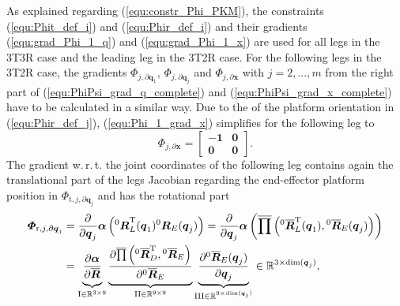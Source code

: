 \documentclass[robotics,article,submit,moreauthors,pdftex]{Definitions/mdpi}
\newcommand{\bm}[1]{\boldsymbol{#1}}
\newcommand{\rotmat}[2]{{{ }^{#1}\boldsymbol{R}}_{#2}}
\newcommand{\rotmato}[2]{{{ }^{#1}\boldsymbol{\overline{R}}}_{#2}}
\newcommand{\transp}[0]{{\mathrm{T}}}
\let\Phi\varPhi
\begin{document}
As explained regarding (\ref{equ:constr_Phi_PKM}), the constraints (\ref{equ:Phit_def_i}) and (\ref{equ:Phir_def_i}) and their gradients (\ref{equ:grad_Phi_1_q}) and (\ref{equ:grad_Phi_1_x}) are used for all legs in the 3T3R case and the leading leg in the 3T2R case.
For the following legs in the 3T2R case, the gradients $\bm{\Phi}_{j,\partial\bm{q}_1}$, $\bm{\Phi}_{j,\partial\bm{q}_j}$ and $\bm{\Phi}_{j,\partial\bm{x}}$ with $j=2,...,m$ from the right part of (\ref{equ:PhiPsi_grad_q_complete}) and (\ref{equ:PhiPsi_grad_x_complete}) have to be calculated in a similar way. 
Due to the  of the platform orientation in (\ref{equ:Phir_def_j}), (\ref{equ:Phi_1_grad_x}) simplifies for the following leg to 
%
\vspace{-0.1cm}
\begin{equation}
\bm{\Phi}_{j,\partial\bm{x}}
=
\begin{bmatrix}
-\bm{1} & \bm{0} \\
\bm{0} & \bm{0}
\end{bmatrix}.
\end{equation}
%
The gradient w.\,r.\,t. the joint coordinates of the following leg contains again the translational part of the legs Jacobian regarding the end-effector platform position in $\bm{\Phi}_{\mathrm{t},j,\partial\bm{q}_j}$ and has the rotational part
%
\begin{align}
\bm{\Phi}_{\mathrm{r},j,\partial\bm{q}_j}
&=
\frac{\partial}{\partial \bm{q}_j} \bm{\alpha}\left(\rotmat{0}{L}^\transp(\bm{q}_1) \rotmat{0}{E}(\bm{q}_j)\right)
=
\frac{\partial}{\partial \bm{q}_j} \bm{\alpha}\left(\overline{\prod}\left( \rotmato{0}{L}^\transp(\bm{q}_1), \rotmato{0}{E}(\bm{q}_j)\right)\right) \label{equ:grad_Phi_j_qj}\\
&=
\underbrace{
	\vphantom{\frac{\partial \rotmato{0}{E}(\bm{q}_j)}{\partial \bm{q}_j}}
	\frac{\partial \bm{\alpha}}{\partial \overline{\bm{R}}}
	}_{\mathrm{I} \in {\mathbb{R}}^{3 \times 9}}
\underbrace{
	\vphantom{\frac{\partial \rotmato{0}{E}(\bm{q}_j)}{\partial \bm{q}_j}}
	\frac{\partial \overline{\prod}\left(\rotmato{0}{D}^\transp, \rotmato{0}{E}\right)}{\partial \rotmato{0}{E}}
	}_{\mathrm{II} \in {\mathbb{R}}^{9 \times 9}}
\underbrace{
	\frac{\partial \rotmato{0}{E}(\bm{q}_j)}{\partial \bm{q}_j}
	}_{\mathrm{III} \in {\mathbb{R}}^{9 \times \mathrm{dim}(\bm{q}_j)}}
\in {\mathbb{R}}^{3 \times \mathrm{dim}(\bm{q}_j)}, \nonumber
\end{align}
\end{document}
